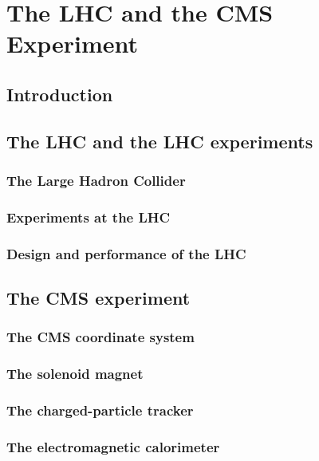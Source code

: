 \chapter{The LHC and the CMS Experiment} %

\label{Chapter2} %


\section{Introduction}

\section{The LHC and the LHC experiments}
\subsection{The Large Hadron Collider}
\subsection{Experiments at the LHC}
\subsection{Design and performance of the LHC}

\section{The CMS experiment}
\subsection{The CMS coordinate system} 
\subsection{The solenoid magnet} 
\subsection{The charged-particle tracker} 
\subsection{The electromagnetic calorimeter} 
